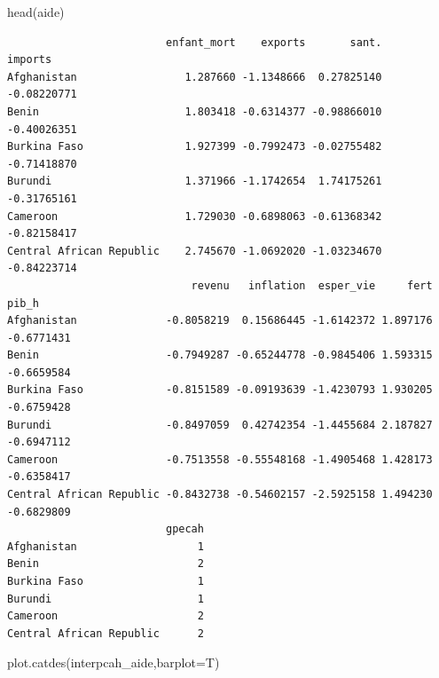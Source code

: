 \documentclass[
]{article}
\newenvironment{Shaded}{}{}
\newcommand{\AttributeTok}[1]{#1}
\newcommand{\FunctionTok}[1]{#1}
\newcommand{\NormalTok}[1]{#1}
\begin{document}
\begin{Shaded}
\begin{Highlighting}[]
\FunctionTok{head}\NormalTok{(aide)}
\end{Highlighting}
\end{Shaded}

\begin{verbatim}
                         enfant_mort    exports       sant.     imports
Afghanistan                 1.287660 -1.1348666  0.27825140 -0.08220771
Benin                       1.803418 -0.6314377 -0.98866010 -0.40026351
Burkina Faso                1.927399 -0.7992473 -0.02755482 -0.71418870
Burundi                     1.371966 -1.1742654  1.74175261 -0.31765161
Cameroon                    1.729030 -0.6898063 -0.61368342 -0.82158417
Central African Republic    2.745670 -1.0692020 -1.03234670 -0.84223714
                             revenu   inflation  esper_vie     fert      pib_h
Afghanistan              -0.8058219  0.15686445 -1.6142372 1.897176 -0.6771431
Benin                    -0.7949287 -0.65244778 -0.9845406 1.593315 -0.6659584
Burkina Faso             -0.8151589 -0.09193639 -1.4230793 1.930205 -0.6759428
Burundi                  -0.8497059  0.42742354 -1.4455684 2.187827 -0.6947112
Cameroon                 -0.7513558 -0.55548168 -1.4905468 1.428173 -0.6358417
Central African Republic -0.8432738 -0.54602157 -2.5925158 1.494230 -0.6829809
                         gpecah
Afghanistan                   1
Benin                         2
Burkina Faso                  1
Burundi                       1
Cameroon                      2
Central African Republic      2
\end{verbatim}

\begin{Shaded}
\begin{Highlighting}[]
\FunctionTok{plot.catdes}\NormalTok{(interpcah\_aide,}\AttributeTok{barplot=}\NormalTok{T)}
\end{Highlighting}
\end{Shaded}
\end{document}
